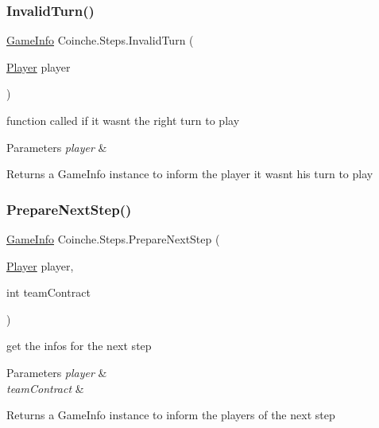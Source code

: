 \subsubsection{\texorpdfstring{Invalid\+Turn()}{InvalidTurn()}}
{\footnotesize\ttfamily \hyperlink{class_coinche_1_1_tools_1_1_game_info}{Game\+Info} Coinche.\+Steps.\+Invalid\+Turn (\begin{DoxyParamCaption}\item[{\hyperlink{class_coinche_1_1_player}{Player}}]{player }\end{DoxyParamCaption})\hspace{0.3cm}{\ttfamily [inline]}}



function called if it wasn\textquotesingle{}t the right turn to play 


\begin{DoxyParams}{Parameters}
{\em player} & \\
\hline
\end{DoxyParams}
\begin{DoxyReturn}{Returns}
a Game\+Info instance to inform the player it wasn\textquotesingle{}t his turn to play
\end{DoxyReturn}
\mbox{\label{class_coinche_1_1_steps_ab92a1baf655d05a75cd0b9842f4b5a36}} 
\subsubsection{\texorpdfstring{Prepare\+Next\+Step()}{PrepareNextStep()}}
{\footnotesize\ttfamily \hyperlink{class_coinche_1_1_tools_1_1_game_info}{Game\+Info} Coinche.\+Steps.\+Prepare\+Next\+Step (\begin{DoxyParamCaption}\item[{\hyperlink{class_coinche_1_1_player}{Player}}]{player,  }\item[{int}]{team\+Contract }\end{DoxyParamCaption})\hspace{0.3cm}{\ttfamily [inline]}}



get the infos for the next step 


\begin{DoxyParams}{Parameters}
{\em player} & \\
\hline
{\em team\+Contract} & \\
\hline
\end{DoxyParams}
\begin{DoxyReturn}{Returns}
a Game\+Info instance to inform the players of the next step
\end{DoxyReturn}
\mbox{\label{class_coinche_1_1_steps_a6d7bee3e38106357f9dd82e42e75c94a}} 
